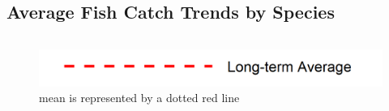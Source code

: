 \documentclass[
]{book}
\begin{document}
\hypertarget{average-fish-catch-trends-by-species}{%
\subsection{Average Fish Catch Trends by Species}\label{average-fish-catch-trends-by-species}}

\begin{columns-nocenter}

\begin{column}

\begin{figure}
\includegraphics[width=15.25in]{figures/mline} \caption{mean is represented by a dotted red line}\label{fig:unnamed-chunk-31}
\end{figure}

\end{column}

\begin{column}

\end{column}

\begin{column}

\end{column}

\end{columns-nocenter}
\end{document}
